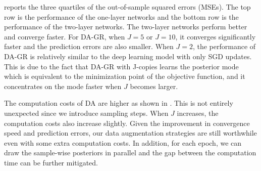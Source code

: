 \documentclass[ba]{imsart}
\numberwithin{equation}{section}
\theoremstyle{plain}
\begin{document}
 reports the three quartiles of the out-of-sample squared errors (MSEs). The top row is the performance of the one-layer networks and the bottom row is the performance of the two-layer networks. The two-layer networks perform better and converge faster. For DA-GR, when $J=5$ or $J=10$, it converges significantly faster and the prediction errors are also smaller. When $J=2$, the performance of DA-GR is relatively similar to the deep learning model with only SGD updates. This is due to the fact that DA-GR with J-copies learns the posterior mode which is equivalent to the minimization point of the objective function, and it concentrates on the mode faster when $J$ becomes larger.

The computation costs of DA are higher as shown in . This is not entirely unexpected since we introduce sampling steps. When $J$ increases, the computation costs also increase slightly. Given the improvement in convergence speed and prediction errors, our data augmentation strategies are still worthwhile even with some extra computation costs. In addition, for each epoch, we can draw the sample-wise posteriors in parallel and the gap between the computation time can be further  mitigated.
\end{document}

